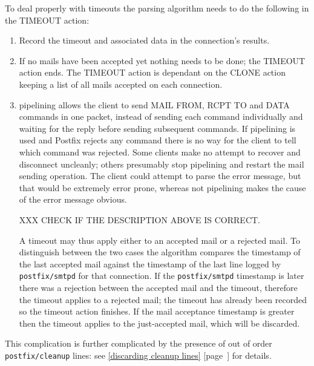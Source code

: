 \documentclass[a4paper,12pt,draft]{article}
\newcommand{\refwithpage}[1]{%
    \empty{}\ref{#1} [page~\pageref{#1}]%
}
\newcommand{\sectionref}[1]{%
    \textsection{}\refwithpage{#1}%
}
\newcommand{\daemon}[1]{%
    \texttt{postfix/#1}%
}
\begin{document}
To deal properly with timeouts the parsing algorithm needs to do the
following in the TIMEOUT action:

\begin{enumerate}

    \item Record the timeout and associated data in the connection's
        results.

    \item If no mails have been accepted yet nothing needs to be done; the
        TIMEOUT action ends.  The TIMEOUT action is dependant on the CLONE
        action keeping a list of all mails accepted on each connection.

    \item \ESMTP{} pipelining allows the client to send MAIL FROM, RCPT TO
        and DATA commands in one packet, instead of sending each command
        individually and waiting for the reply before sending subsequent
        commands.  If pipelining is used and Postfix rejects any command
        there is no way for the client to tell which command was rejected.
        Some clients make no attempt to recover and disconnect uncleanly;
        others presumably stop pipelining and restart the mail sending
        operation.  The client could attempt to parse the error message,
        but that would be extremely error prone, whereas not pipelining
        makes the cause of the error message obvious.

        XXX CHECK IF THE DESCRIPTION ABOVE IS CORRECT\@.

        A timeout may thus apply either to an accepted mail or a rejected
        mail.  To distinguish between the two cases the algorithm compares
        the timestamp of the last accepted mail against the timestamp of
        the last line logged by \daemon{smtpd} for that connection.  If the
        \daemon{smtpd} timestamp is later there was a rejection between the
        accepted mail and the timeout, therefore the timeout applies to a
        rejected mail; the timeout has already been recorded so the timeout
        action finishes.  If the mail acceptance timestamp is greater then
        the timeout applies to the just-accepted mail, which will be
        discarded.

\end{enumerate}

This complication is further complicated by the presence of out of order
\daemon{cleanup} lines: see \sectionref{discarding cleanup lines} for
details.
\end{document}
